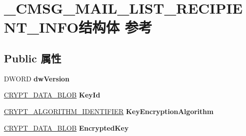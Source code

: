 \hypertarget{struct___c_m_s_g___m_a_i_l___l_i_s_t___r_e_c_i_p_i_e_n_t___i_n_f_o}{}\section{\+\_\+\+C\+M\+S\+G\+\_\+\+M\+A\+I\+L\+\_\+\+L\+I\+S\+T\+\_\+\+R\+E\+C\+I\+P\+I\+E\+N\+T\+\_\+\+I\+N\+F\+O结构体 参考}
\label{struct___c_m_s_g___m_a_i_l___l_i_s_t___r_e_c_i_p_i_e_n_t___i_n_f_o}
\subsection*{Public 属性}
\begin{DoxyCompactItemize}
\item 
\mbox{\label{struct___c_m_s_g___m_a_i_l___l_i_s_t___r_e_c_i_p_i_e_n_t___i_n_f_o_ae1a0ebed5f1bf37b62dc22d0550ad52a}} 
D\+W\+O\+RD {\bfseries dw\+Version}
\item 
\mbox{\label{struct___c_m_s_g___m_a_i_l___l_i_s_t___r_e_c_i_p_i_e_n_t___i_n_f_o_a5013a5dfdab98dedfe68be845731a163}} 
\hyperlink{struct___c_r_y_p_t_o_a_p_i___b_l_o_b}{C\+R\+Y\+P\+T\+\_\+\+D\+A\+T\+A\+\_\+\+B\+L\+OB} {\bfseries Key\+Id}
\item 
\mbox{\label{struct___c_m_s_g___m_a_i_l___l_i_s_t___r_e_c_i_p_i_e_n_t___i_n_f_o_ac1f9148bb2042f069321e015efa52c9b}} 
\hyperlink{struct___c_r_y_p_t___a_l_g_o_r_i_t_h_m___i_d_e_n_t_i_f_i_e_r}{C\+R\+Y\+P\+T\+\_\+\+A\+L\+G\+O\+R\+I\+T\+H\+M\+\_\+\+I\+D\+E\+N\+T\+I\+F\+I\+ER} {\bfseries Key\+Encryption\+Algorithm}
\item 
\mbox{\label{struct___c_m_s_g___m_a_i_l___l_i_s_t___r_e_c_i_p_i_e_n_t___i_n_f_o_a25544f6d051f5ea503f5047279af0d62}} 
\hyperlink{struct___c_r_y_p_t_o_a_p_i___b_l_o_b}{C\+R\+Y\+P\+T\+\_\+\+D\+A\+T\+A\+\_\+\+B\+L\+OB} {\bfseries Encrypted\+Key}
\item 
\mbox{\label{struct___c_m_s_g___m_a_i_l___l_i_s_t___r_e_c_i_p_i_e_n_t___i_n_f_o_a9a3efbd4d970d7cdf0ea29cf3ee86d7d}} 

\end{DoxyCompactItemize}
